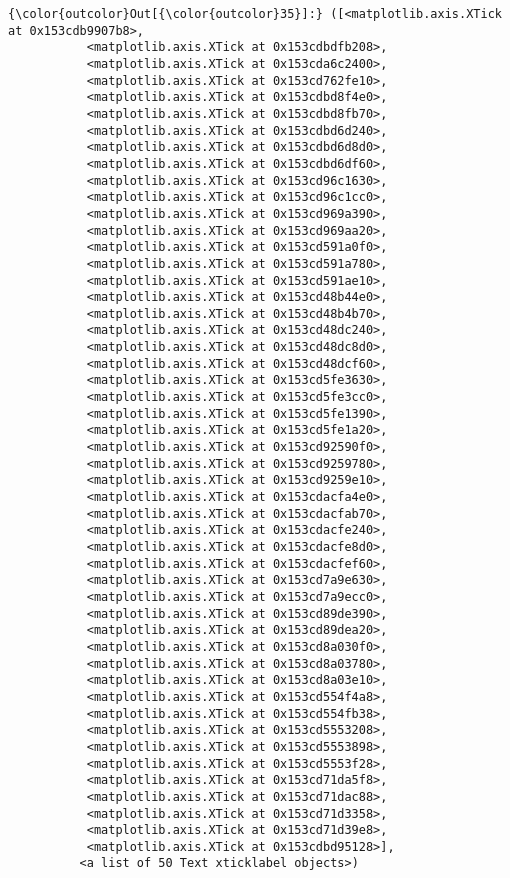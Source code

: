 \documentclass[11pt]{article}
\begin{document}
\begin{Verbatim}[commandchars=\\\{\}]
{\color{outcolor}Out[{\color{outcolor}35}]:} ([<matplotlib.axis.XTick at 0x153cdb9907b8>,
           <matplotlib.axis.XTick at 0x153cdbdfb208>,
           <matplotlib.axis.XTick at 0x153cda6c2400>,
           <matplotlib.axis.XTick at 0x153cd762fe10>,
           <matplotlib.axis.XTick at 0x153cdbd8f4e0>,
           <matplotlib.axis.XTick at 0x153cdbd8fb70>,
           <matplotlib.axis.XTick at 0x153cdbd6d240>,
           <matplotlib.axis.XTick at 0x153cdbd6d8d0>,
           <matplotlib.axis.XTick at 0x153cdbd6df60>,
           <matplotlib.axis.XTick at 0x153cd96c1630>,
           <matplotlib.axis.XTick at 0x153cd96c1cc0>,
           <matplotlib.axis.XTick at 0x153cd969a390>,
           <matplotlib.axis.XTick at 0x153cd969aa20>,
           <matplotlib.axis.XTick at 0x153cd591a0f0>,
           <matplotlib.axis.XTick at 0x153cd591a780>,
           <matplotlib.axis.XTick at 0x153cd591ae10>,
           <matplotlib.axis.XTick at 0x153cd48b44e0>,
           <matplotlib.axis.XTick at 0x153cd48b4b70>,
           <matplotlib.axis.XTick at 0x153cd48dc240>,
           <matplotlib.axis.XTick at 0x153cd48dc8d0>,
           <matplotlib.axis.XTick at 0x153cd48dcf60>,
           <matplotlib.axis.XTick at 0x153cd5fe3630>,
           <matplotlib.axis.XTick at 0x153cd5fe3cc0>,
           <matplotlib.axis.XTick at 0x153cd5fe1390>,
           <matplotlib.axis.XTick at 0x153cd5fe1a20>,
           <matplotlib.axis.XTick at 0x153cd92590f0>,
           <matplotlib.axis.XTick at 0x153cd9259780>,
           <matplotlib.axis.XTick at 0x153cd9259e10>,
           <matplotlib.axis.XTick at 0x153cdacfa4e0>,
           <matplotlib.axis.XTick at 0x153cdacfab70>,
           <matplotlib.axis.XTick at 0x153cdacfe240>,
           <matplotlib.axis.XTick at 0x153cdacfe8d0>,
           <matplotlib.axis.XTick at 0x153cdacfef60>,
           <matplotlib.axis.XTick at 0x153cd7a9e630>,
           <matplotlib.axis.XTick at 0x153cd7a9ecc0>,
           <matplotlib.axis.XTick at 0x153cd89de390>,
           <matplotlib.axis.XTick at 0x153cd89dea20>,
           <matplotlib.axis.XTick at 0x153cd8a030f0>,
           <matplotlib.axis.XTick at 0x153cd8a03780>,
           <matplotlib.axis.XTick at 0x153cd8a03e10>,
           <matplotlib.axis.XTick at 0x153cd554f4a8>,
           <matplotlib.axis.XTick at 0x153cd554fb38>,
           <matplotlib.axis.XTick at 0x153cd5553208>,
           <matplotlib.axis.XTick at 0x153cd5553898>,
           <matplotlib.axis.XTick at 0x153cd5553f28>,
           <matplotlib.axis.XTick at 0x153cd71da5f8>,
           <matplotlib.axis.XTick at 0x153cd71dac88>,
           <matplotlib.axis.XTick at 0x153cd71d3358>,
           <matplotlib.axis.XTick at 0x153cd71d39e8>,
           <matplotlib.axis.XTick at 0x153cdbd95128>],
          <a list of 50 Text xticklabel objects>)
\end{Verbatim}
            
\end{document}
